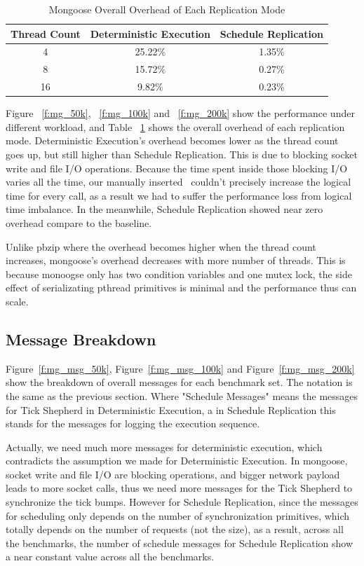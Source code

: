 \begin{table}
\caption{Mongoose Overall Overhead of Each Replication Mode}
\begin{center}
 \begin{tabular}{c | c | c}
Thread Count & Deterministic Execution & Schedule Replication \\ \hline
 4 & 25.22\% & 1.35\% \\ \hline
 8 & 15.72\% & 0.27\% \\ \hline
 16 & 9.82\% & 0.23\% \\ \hline
 \end{tabular}
\end{center}
\label{t:mongoose_overall}
\end{table}

Figure ~\ref{f:mg_50k}, ~\ref{f:mg_100k} and ~\ref{f:mg_200k} show the performance under different workload, and Table ~\ref{t:mongoose_overall} shows the overall overhead of each replication mode. Deterministic Execution's overhead becomes lower as the thread count goes up, but still higher than Schedule Replication. This is due to blocking socket write and file I/O  operations. Because the time spent inside those blocking I/O varies all the time, our manually inserted \dettick\ couldn't precisely increase the logical time for every call, as a result we had to suffer the performance loss from logical time imbalance. In the meanwhile, Schedule Replication showed near zero overhead compare to the baseline.

Unlike pbzip where the overhead becomes higher when the thread count increases, mongoose's overhead decreases with more number of threads. This is because monoogse only has two condition variables and one mutex lock, the side effect of serializating pthread primitives is minimal and the performance thus can scale.

\subsection{Message Breakdown}
Figure~\ref{f:mg_msg_50k}, Figure~\ref{f:mg_msg_100k} and Figure~\ref{f:mg_msg_200k} show the breakdown of overall messages for each benchmark set. The notation is the same as the previous section. Where "Schedule Messages" means the messages for Tick Shepherd in Deterministic Execution, a in Schedule Replication this stands for the messages for logging the execution sequence.

Actually, we need much more messages for deterministic execution, which contradicts the assumption we made for Deterministic Execution. In mongoose, socket write and file I/O are blocking operations, and bigger network payload leads to more socket calls, thus we need more messages for the Tick Shepherd to synchronize the tick bumps. However for Schedule Replication, since the messages for scheduling only depends on the number of synchronization primitives, which totally depends on the number of requests (not the size), as a result, across all the benchmarks, the number of schedule messages for Schedule Replication show a near constant value across all the benchmarks.


